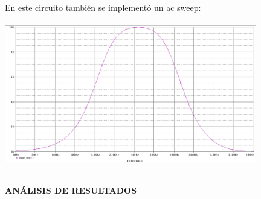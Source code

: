 \documentclass[12pt]{article}
\begin{document}
\begin{itemize}
		\noindent En este circuito también se implementó un ac sweep:\\
		
		\includegraphics[width=11cm,height=7cm]{Img/filtro_pasa_alto_activo}\\
		
	\end{itemize}
	
	\newpage
	
	\begin{center}
		\textbf{\large ANÁLISIS DE RESULTADOS}\\
	\end{center}
	
	\renewcommand{\theenumi}{\alph{enumi}} %
	
\end{document}
